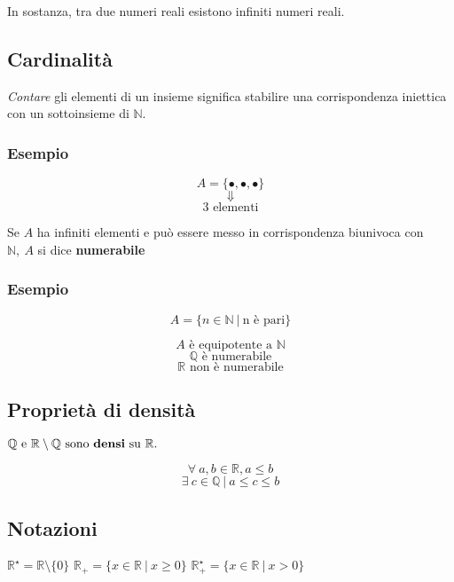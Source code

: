 \begin{itemize}
            In sostanza, tra due numeri reali esistono infiniti numeri reali.
    \end{itemize}
\subsection{Cardinalità}
\textit{Contare} gli elementi di un insieme significa stabilire una corrispondenza iniettica con un sottoinsieme di $\mathbb{N}$.

\subsubsection*{Esempio}
\begin{Large}
    \[
        A = \{\bullet,\bullet,\bullet\}
    \]
    \[
        \Downarrow
    \]
    \[
        \text{3 elementi}    
    \]
\end{Large}
Se $A$ ha infiniti elementi e può essere messo in corrispondenza biunivoca con $\mathbb{N},\ A$ si dice \textbf{numerabile}
\subsubsection*{Esempio}
    \begin{Large}
    \[A = \{n \in \mathbb{N}\ |\ \text{n è pari} \}\] \newline
    \end{Large}
    \[A \text{ è equipotente a }\mathbb{N}\]
    \[\mathbb{Q} \text{ è numerabile}\]
    \[\mathbb{R} \text{ non è numerabile}\]
\subsection{Proprietà di densità}
    $\mathbb{Q} \text{ e } \mathbb{R} \setminus \mathbb{Q} \text{ sono \textbf{densi} su }\mathbb{R}.$
    \begin{Large}
        \begin{equation*}
            \forall\ a,b \in \mathbb{R},a \le b
        \end{equation*}
        \begin{equation*}
            \exists\ c \in \mathbb{Q}\ |\ a \le c \le b 
        \end{equation*}
    \end{Large}
\subsection{Notazioni}
\begin{Large}
    $\mathbb{R}^{\star} = \mathbb{R} \setminus \{0\}$\newline
    $\mathbb{R}_{+} = \{x \in \mathbb{R}\ |\ x \geq 0\}$\newline
    $\mathbb{R}_{+}^{\star} = \{x \in \mathbb{R}\ |\ x > 0\}$
\end{Large}
